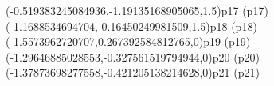 \psPoint(-0.519383245084936,-1.19135168905065,1.5){p17}
\psdot[dotstyle=Bo,fillcolor=darkgray](p17)
\psPoint(-1.1688534694704,-0.16450249981509,1.5){p18}
\psdot[dotstyle=Bo,fillcolor=darkgray](p18)
\psPoint(-1.5573962720707,0.267392584812765,0){p19}
\psdot[dotstyle=Btriangle,fillcolor=darkgray](p19)
\psPoint(-1.29646885028553,-0.327561519794944,0){p20}
\psdot[dotstyle=Btriangle,fillcolor=darkgray](p20)
\psPoint(-1.37873698277558,-0.421205138214628,0){p21}
\psdot[dotstyle=Btriangle,fillcolor=darkgray](p21)
